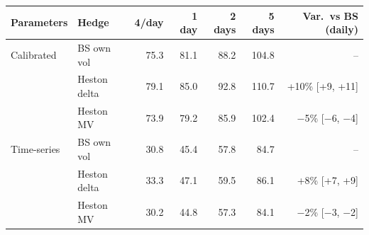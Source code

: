 \begin{tabular}{llrrrrr}
\toprule
Parameters & Hedge & 4/day & 1 day & 2 days & 5 days & Var.\ vs BS (daily) \\
\midrule
Calibrated & BS own vol & 75.3 & 81.1 & 88.2 & 104.8 & -- \\
 & Heston delta & 79.1 & 85.0 & 92.8 & 110.7 & +10\% [+9, +11] \\
 & Heston MV & 73.9 & 79.2 & 85.9 & 102.4 & $-$5\% [$-$6, $-$4] \\
\midrule
Time-series & BS own vol & 30.8 & 45.4 & 57.8 & 84.7 & -- \\
 & Heston delta & 33.3 & 47.1 & 59.5 & 86.1 & +8\% [+7, +9] \\
 & Heston MV & 30.2 & 44.8 & 57.3 & 84.1 & $-$2\% [$-$3, $-$2] \\
\bottomrule
\end{tabular}

